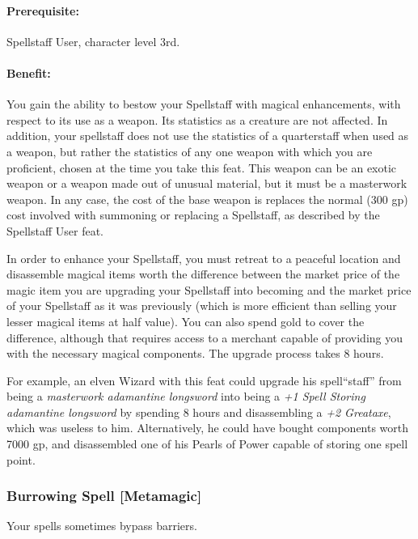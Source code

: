 \paragraph{Prerequisite:} Spellstaff User, character level 3rd.
 
\paragraph{Benefit:} You gain the ability to bestow your Spellstaff with magical enhancements, with respect to its use as a weapon. Its statistics as a creature are not affected. 
In addition, your spellstaff does not use the statistics of a quarterstaff when used as a weapon, 
but rather the statistics of any one weapon with which you are proficient, chosen at the time you take this feat.
This weapon can be an exotic weapon or a weapon made out of unusual material, but it must be a masterwork weapon. 
In any case, the cost of the base weapon is replaces the
normal (300 gp) cost involved with summoning or replacing a Spellstaff, as described by the Spellstaff User feat.

In order to enhance your Spellstaff, you must retreat to a peaceful location and disassemble magical items worth the difference between the market price of the magic item you are upgrading your Spellstaff
into becoming and the market price of your Spellstaff as it was previously (which is more efficient than selling your lesser magical items at half value).
You can also spend gold to cover the difference, although that requires access to a merchant capable of providing you with the necessary magical components.
The upgrade process takes 8 hours.%

For example, an elven Wizard with this feat could upgrade his spell``staff'' from being a 
\emph{masterwork adamantine longsword} into being a \emph{+1 Spell Storing adamantine longsword} by spending 8 hours and %
disassembling a \emph{+2 Greataxe}, which was useless to him.
Alternatively, he could have bought components worth 7000 gp, and disassembled one of his Pearls of Power capable of storing one spell point.
\subsubsection[Burrowing Spell]{Burrowing Spell [Metamagic]}
\label{Feat:BurrowingSpell}
Your spells sometimes bypass barriers.

